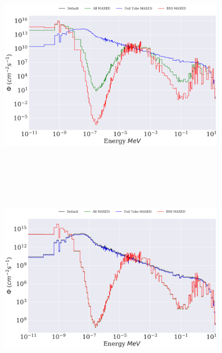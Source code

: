 \begin{figure}[htb]
\includegraphics[height=4in]{tex/figures/unfolded_mx.png}
\caption[]{}
\label{fig:unfolded_mx}
\end{figure}

\begin{figure}[htb]
\includegraphics[height=4in]{tex/figures/unfolded_mx_sc.png}
\caption[]{}
\label{fig:unfolded_mx_sc}
\end{figure}
